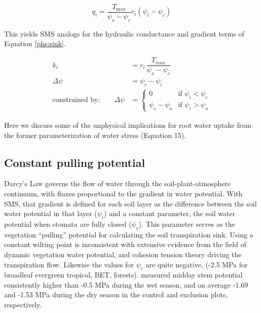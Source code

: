 \documentclass[draft,linenumbers]{agujournal}
\begin{document}
    \begin{linenomath*}
    \begin{equation}
    \label{eq:btrwu}
    q_i = \dfrac{T_{\text{max}}}{\psi_{o}-\psi_{c}} r_i \left(\psi_i-\psi_{c} \right)
    \end{equation}
    \end{linenomath*}
    
    This yields SMS analogs for the hydraulic conductance and gradient terms of Equation \ref{phs:sink}.
    \begin{linenomath*}
    \begin{equation} \begin{aligned}
    k_i &= r_i \, \dfrac{T_{max}}{\psi_{o}-\psi_{c}} \\
    \Delta\psi &=  \psi_{c}-\psi_i \\
    \mbox{constrained by:} \qquad
    \Delta\psi &=
    \begin{cases}
    0                          & \text{if } \psi_i<\psi_{c}  \\
    \psi_{c}-\psi_{o} & \text{if } \psi_i>\psi_{o}
    \label{kb}
    \end{cases}
    \end{aligned}\end{equation}
    \end{linenomath*}

    Here we discuss some of the unphysical implications for root water uptake from the former parameterization of water stress (Equation 15).
    
    \subsection{Constant pulling potential}
    Darcy's Law governs the flow of water through the soil-plant-atmosphere continuum, 
    with fluxes proportional to the gradient in water potential. 
    With SMS, that gradient is defined for each soil layer as 
    the difference between the soil water potential in that layer ($\psi_i$) 
    and a constant parameter, the soil water potential when stomata are fully closed ($\psi_{c}$).
    This parameter serves as the vegetation ``pulling'' potential for calculating the soil transpiration sink.
    Using a constant wilting point is inconsistent with extensive evidence from the field of dynamic vegetation water potential, and cohesion tension theory driving the transpiration flow.
    Likewise the values for $\psi_{c}$ are quite negative, (-2.5 MPa for broadleaf evergreen tropical, BET, forests). 
    \cite{fisher2006} measured midday stem potential consistently higher than -0.5 MPa during the wet season, and on average -1.69 and -1.53 MPa during the dry season in the control and exclusion plots, respectively.
    
\end{document}
